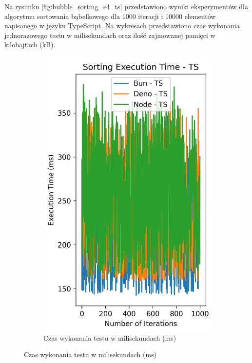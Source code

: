 Na rysunku \ref{fig:bubble_sorting_e4_ts} przedstawiono wyniki eksperymentów dla algorytmu sortowania bąbelkowego dla 1000 iteracji i 10000 elementów napisanego w języku TypeScript. Na wykresach przedstawiono czas wykonania jednorazowego testu w milisekundach oraz ilość zajmowanej pamięci w kilobajtach (kB).

\begin{figure}[H]
  \centering
  \begin{subfigure}[b]{0.42\textwidth}
    \centering
    \includegraphics[width=\textwidth]{Figures/sorting/sorting_bubble_1000_10000_ts_time.png}
    \caption{Czas wykonania testu w milisekundach (ms)}

\end{subfigure}
\end{figure}
